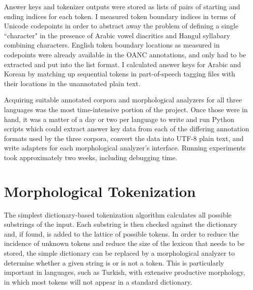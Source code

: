 Answer keys and tokenizer outputs were stored as lists of pairs of starting and ending indices for each token. I measured token boundary indices in terms of Unicode codepoints in order to abstract away the problem of defining a single ``character" in the presence of Arabic vowel diacritics and Hangul syllabary combining characters. English token boundary locations as measured in codepoints were already available in the OANC annotations, and only had to be extracted and put into the list format. I calculated answer keys for Arabic and Korean by matching up sequential tokens in part-of-speech tagging files with their locations in the unannotated plain text.

Acquiring suitable annotated corpora and morphological analyzers for all three languages was the most time-intensive portion of the project. Once those were in hand, it was a matter of a day or two per language to write and run Python scripts which could extract answer key data from each of the differing annotation formats used by the three corpora, convert the data into UTF-8 plain text, and write adapters for each morphological analyzer's interface. Running experiments took approximately two weeks, including debugging time.

\section{Morphological Tokenization}
The simplest dictionary-based tokenization algorithm calculates all possible substrings of the input. Each substring is then checked against the dictionary and, if found, is added to the lattice of possible tokens. In order to reduce the incidence of unknown tokens and reduce the size of the lexicon that needs to be stored, the simple dictionary can be replaced by a morphological analyzer to determine whether a given string is or is not a token. This is particularly important in languages, such as Turkish, with extensive productive morphology, in which most tokens will not appear in a standard dictionary.

